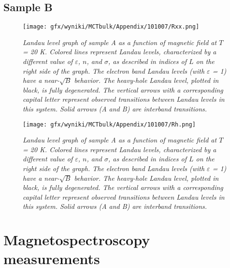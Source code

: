 \documentclass[titlepage,a4paper]{book}
\begin{document}
\subsection{Sample B}
\begin{figure}[ht]
	\centering
	\texttt{[image: gfx/wyniki/MCTbulk/Appendix/101007/Rxx.png]}
	\vspace{-10pt}
	\caption{\textit{Landau level graph of sample A as a function of magnetic field at $T$ = 20 K. Colored lines represent Landau levels, characterized by a different value of $\varepsilon$, $n$, and $\sigma$, as described in indices of $L$ on the right side of the graph. The electron band Landau levels (with $\varepsilon$ = 1) have a near-$\sqrt{B}$ behavior. The heavy-hole Landau level, plotted in black, is fully degenerated. The vertical arrows with a corresponding capital letter represent observed transitions between Landau levels in this system. Solid arrows (A and B) are interband transitions.}}
	\label{fig:101007_Rxx}
\end{figure}
\begin{figure}[ht]
	\centering
	\texttt{[image: gfx/wyniki/MCTbulk/Appendix/101007/Rh.png]}
	\vspace{-10pt}
	\caption{\textit{Landau level graph of sample A as a function of magnetic field at $T$ = 20 K. Colored lines represent Landau levels, characterized by a different value of $\varepsilon$, $n$, and $\sigma$, as described in indices of $L$ on the right side of the graph. The electron band Landau levels (with $\varepsilon$ = 1) have a near-$\sqrt{B}$ behavior. The heavy-hole Landau level, plotted in black, is fully degenerated. The vertical arrows with a corresponding capital letter represent observed transitions between Landau levels in this system. Solid arrows (A and B) are interband transitions.}}
	\label{fig:101007_Rh}
\end{figure}


\section{Magnetospectroscopy measurements}
\end{document}
